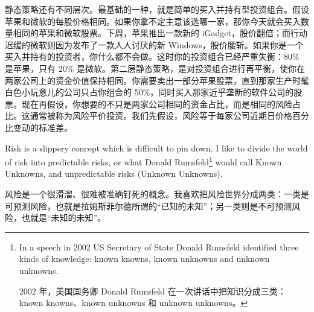 \begin{chineseblock}静态策略还有不同层次。最基础的一种，就是简单的买入并持有型投资组合。假设苹果和微软的每股价格相同。如果你拿不定主意该选哪一家，那你今天就会买入数量相同的苹果和微软股票。下周，苹果推出一款新的 iGadget，股价翻倍；而行动迟缓的微软则因为发布了一款人人讨厌的新 Windows，股价腰斩。如果你是一个买入并持有的投资者，你什么都不会做。这时你的投资组合已经严重失衡：80\% 是苹果，只有 20\% 是微软。第二层静态策略，是对投资组合进行再平衡，使你在两家公司上的资金价值保持相同。你需要卖出一部分苹果股票，直到那家生产时髦白色小玩意儿的公司只占你组合的 50\%，同时买入那家近乎垄断的软件公司的股票。现在再假设，你想要的不只是两家公司相同的资金占比，而是相同的风险占比。这通常被称为风险平价投资。我们先假设，风险等于每家公司近期日价格百分比变动的标准差。\end{chineseblock}


\begin{englishblock} Risk is a slippery concept which is difficult to pin down. I like to divide the world of risk into predictable risks, or what Donald Rumsfeld\footnote{In a speech in 2002 US Secretary of State Donald Rumsfeld identified three kinds of knowledge: known knowns, known unknowns and unknown unknowns. \par 2002 年，美国国务卿 Donald Rumsfeld 在一次讲话中把知识分成三类：known knowns、known unknowns 和 unknown unknowns。} would call Known Unknowns, and unpredictable risks (Unknown Unknowns). \end{englishblock}

\begin{chineseblock}风险是一个很滑溜、很难被准确钉死的概念。我喜欢把风险世界分成两类：一类是可预测风险，也就是拉姆斯菲尔德所谓的“已知的未知”；另一类则是不可预测风险，也就是“未知的未知”。\end{chineseblock}

\bipairgap


